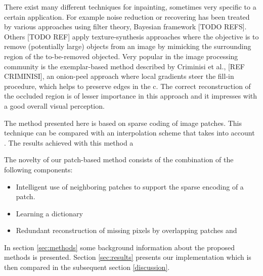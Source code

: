There exist many different techniques for inpainting, sometimes very specific to a certain application. For example noise reduction or recovering has been treated by various approaches using filter theory, Bayesian framework [TODO REFS]. Others [TODO REF] apply texture-synthesis approaches where the objective is to remove (potentially large) objects from an image by mimicking the surrounding region of the to-be-removed objected. Very popular in the image processing community is the exemplar-based method described by Criminisi et al., [REF CRIMINISI], an onion-peel approach where local gradients steer the fill-in procedure, which helps to preserve edges in the c. The correct reconstruction of the occluded region is of lesser importance in this approach and it impresses with a good overall visual perception.

The method presented here is based on sparse coding of image patches. This technique can be compared with an interpolation scheme that takes into account . The results achieved with this method a

The novelty of our patch-based method consists of the combination of the following components:
\begin{itemize}
   \item Intelligent use of neighboring patches to support the sparse encoding of a patch.
   \item Learning a dictionary 
   \item Redundant reconstruction of missing pixels by overlapping patches and 
\end{itemize}

 In section \ref{sec:methods} some background information about the proposed methods is presented. Section \ref{sec:results} presents our implementation which is then compared in the subsequent section \ref{discussion}. 